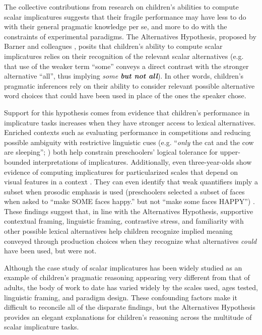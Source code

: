 \documentclass[10pt,letterpaper]{article}
\begin{document}
The collective contributions from research on children's abilities to compute scalar implicatures suggests that their fragile performance may have less to do with their general pragmatic knowledge per se, and more to do with the constraints of experimental paradigms. The Alternatives Hypothesis, proposed by Barner and colleagues \citep{barner2010, barner2011}, posits that children's ability to compute scalar implicatures relies on their recognition of the relevant scalar alternatives (e.g. that use of the weaker term ``some'' conveys a direct contrast with the stronger alternative ``all'', thus implying \emph{some \textbf{but not all}}).  In other words, children's pragmatic inferences rely on their ability to consider relevant possible alternative word choices that could have been used in place of the ones the speaker chose.  

Support for this hypothesis comes from evidence that children's performance in implicature tasks increases when they have stronger access to lexical alternatives.  Enriched contexts such as evaluating performance in competitions \citep{papafragou2003} and reducing possible ambiguity with restrictive linguistic cues (e.g. ``\emph{only} the cat and the cow are sleeping''; \cite{barner2011})  both help constrain preschoolers' logical tolerance for upper-bounded interpretations of implicatures. Additionally, even three-year-olds show evidence of computing implicatures for particularized scales that depend on visual features in a context \citep{stiller2014}. They can even identify that weak quantifiers imply a subset when prosodic emphasis is used (preschoolers selected a subset of faces when asked to ``make SOME faces happy.'' but not ``make some faces HAPPY'') \citep{miller2005}. These findings suggest that, in line with the Alternatives Hypothesis, supportive contextual framing, linguistic framing, contrastive stress, and familiarity with other possible lexical alternatives help children recognize implied meaning conveyed through production choices when they recognize what alternatives \emph{could} have been used, but were not. 

Although the case study of scalar implicatures has been widely studied as an example of children's pragmatic reasoning appearing very different from that of adults, the body of work to date has varied widely by the scales used, ages tested, linguistic framing, and paradigm design.  These confounding factors make it difficult to reconcile all of the disparate findings, but the Alternatives Hypothesis provides an elegant explanations for children's reasoning across the multitude of scalar implicature tasks.  
\end{document}
